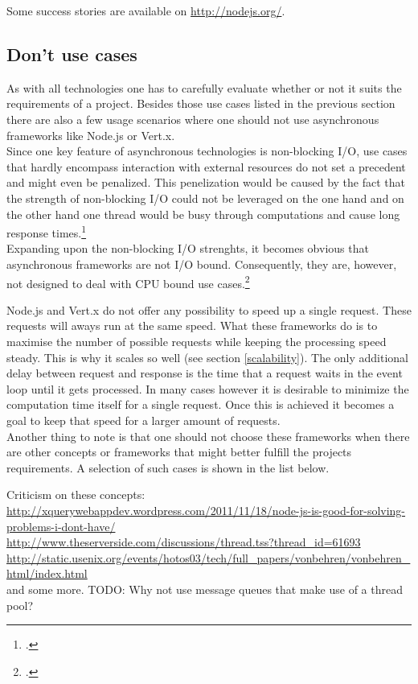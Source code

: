 Some success stories are available on \url{http://nodejs.org/}.

\subsection{Don't use cases}
\label{dont_use_cases}

As with all technologies one has to carefully evaluate whether or not it suits the
requirements of a project. Besides those use cases listed in the previous
section there are also a few usage scenarios where one should not use
asynchronous frameworks like Node.js or Vert.x.\\

Since one key feature of asynchronous technologies is non-blocking I/O, use
cases that hardly encompass interaction with external resources do not set a
precedent and might even be penalized. This penelization would be caused by the
fact that the strength of non-blocking I/O could not be leveraged on the one
hand and on the other hand one thread would be busy through computations and
cause long response times.\footcite[Cf.][14]{Roden_2012}\\

Expanding upon the non-blocking I/O strenghts, it becomes obvious that
asynchronous frameworks are not I/O bound. Consequently, they are, however, not
designed to deal with CPU bound use cases.\footcite[Cf.][15]{Nguyen_2012}

Node.js and Vert.x do not offer any possibility to speed up a single request.
These requests will aways run at the same speed. What these frameworks do is to
maximise the number of possible requests while keeping the processing speed
steady. This is why it scales so well (see section \ref{scalability}). The only
additional delay between request and response is the time that a request waits
in the event loop until it gets processed.  In many cases however it is
desirable to minimize the computation time itself for a single request. Once
this is achieved it becomes a goal to keep that speed for a larger amount of
requests.\\

Another thing to note is that one should not choose these frameworks when
there are other concepts or frameworks that might better fulfill the 
projects requirements.
A selection of such cases is shown in the list below. 

Criticism on these concepts:\\
\url{http://xquerywebappdev.wordpress.com/2011/11/18/node-js-is-good-for-solving-problems-i-dont-have/}\\
\url{http://www.theserverside.com/discussions/thread.tss?thread_id=61693}\\
\url{http://static.usenix.org/events/hotos03/tech/full_papers/vonbehren/vonbehren_html/index.html}\\
and some more. TODO: Why not use message queues that make use of a thread pool?


